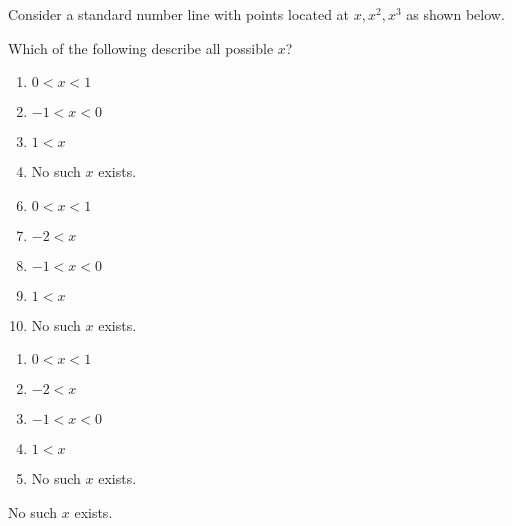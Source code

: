 


 Consider a standard number line with points located at $x, x^{2}, x^{3}$ as shown below.
\begin{center}
\end{center}
Which of the following describe all possible $x$?


\ifsat
	\begin{enumerate}[label=\Alph*)]
		\item    $0<x<1$
		\item $-1<x<0$
		\item $1<x$
		\item  No such $x$ exists. %
	\end{enumerate}
\else
\fi

\ifacteven
	\begin{enumerate}[label=\textbf{\Alph*.},itemsep=\fill,align=left]
		\setcounter{enumii}{5}
		\item    $0<x<1$
		\item $-2<x$ 
		\item $-1<x<0$
		\addtocounter{enumii}{1}
		\item $1<x$
		\item  No such $x$ exists. %
	\end{enumerate}
\else
\fi

\ifactodd
	\begin{enumerate}[label=\textbf{\Alph*.},itemsep=\fill,align=left]
		\item    $0<x<1$
		\item $-2<x$ 
		\item $-1<x<0$
		\item $1<x$
		\item  No such $x$ exists. %
	\end{enumerate}
\else
\fi

\ifgridin
  No such $x$ exists. %

\else
\fi

